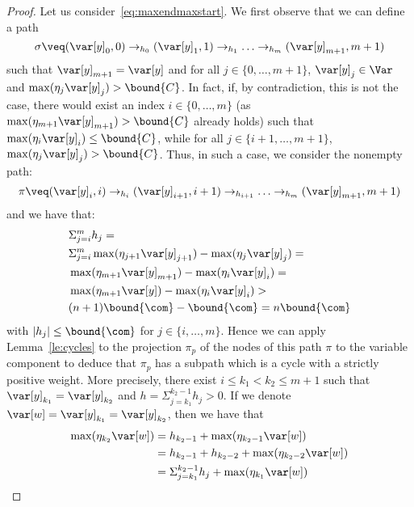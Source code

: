 \begin{proof}
  Let us consider~\eqref{eq:maxendmaxstart}. We first observe that we
  can define a path
  \begin{equation}
    \label{eq:fixnr}
    \sigma \veq (\var[y]_0, 0) \to_{h_0} (\var[y]_1, 1) \to_{h_1}
    \ldots \to_{h_m} (\var[y]_{m+1}, m+1)
  \end{equation}
  such that \(\var[y]_{m+1}=\var[y]\) and for all \(j \in \{0,\ldots, m+1\}\), 
  \(\var[y]_j\in \Var\)  and
  \(\max(\eta_{j} \var[y]_{j}) > \bound{C}\).
  In fact, if, by contradiction, this is not the case, there  would exist an index \(i \in \{0,\ldots, m\}\) (as \(\max(\eta_{m+1} \var[y]_{m+1}) > \bound{C}\) already holds)
  such that \(\max(\eta_{i} \var[y]_{i}) \leq
  \bound{C}\), while for all
  \(j \in \{i+1,\ldots, m+1\}\), \(\max(\eta_{j} \var[y]_j) > \bound{C}\).
  Thus, in such a case, 
  we consider the nonempty path:
  \[\pi \veq (\var[y]_i, i) \to_{h_i} (\var[y]_{i+1}, i+1) \to_{h_{i+1}} \ldots
  \to_{h_m} (\var[y]_{m+1}, m+1)\]
  and we have that:
  \begin{align*}
    &\Sigma_{j=i}^m h_j =\\ 
    &\Sigma_{j=i}^m \max(\eta_{j+1} \var[y]_{j+1}) - \max(\eta_j \var[y]_{j}) =\\
    &\max(\eta_{m+1} \var[y]_{m+1}) - \max(\eta_i \var[y]_{i}) =\\
    &\max(\eta_{m+1} \var[y]) - \max(\eta_i \var[y]_{i})>\\
    &  (n+1) \bound{\com} - \bound{\com} = n \bound{\com}
  \end{align*}
  with \(|h_j| \leq \bound{\com}\) for \(j \in \{i,\ldots, m\}\). Hence
  we can apply Lemma~\ref{le:cycles} to the projection \(\pi_p\) of the nodes
  of this path \(\pi\) to the variable
  component 
  to deduce that \(\pi_p\) has a subpath which is a cycle with a strictly positive weight. 
  More precisely, there
  exist \(i \leq k_1 < k_2 \leq m+1\) such that
  \(\var[y]_{k_1} = \var[y]_{k_2}\) and
  \(h = \Sigma_{j=k_1}^{k_2-1} h_j > 0\). If we denote 
  \(\var[w] = \var[y]_{k_1} = \var[y]_{k_2}\), then we
  have  that   
  \begin{align*}
    \max(\eta_{k_2} \var[w]) & =  h_{k_2-1}  + \max(\eta_{k_2-1} \var[w]) \\
                             & =  h_{k_2-1} + h_{k_2-2} + \max(\eta_{k_2-2} \var[w])  \\
                             & = \Sigma_{j=k_1}^{k_2-1} h_j + \max(\eta_{k_1} \var[w])  \\

\end{align*}
\end{proof}
